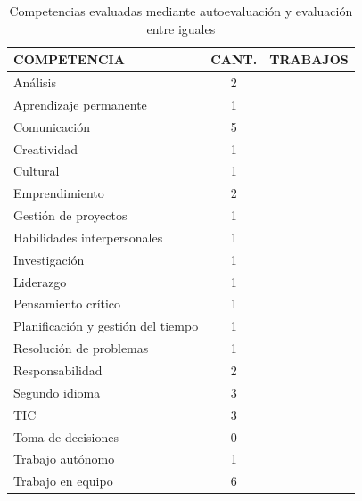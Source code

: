 \begin{table}
  \begin{center}
  \begin{tabular}{| m{3.5cm} | c | m{9cm} |}
    \hline
    COMPETENCIA & CANT. & TRABAJOS\\
    \hline
    \hline
    Análisis & 2 & \cite{carreras2013promotion,lasa2013problem} \\
    \hline
    Aprendizaje permanente & 1 & \cite{oliver2013graduate} \\
    \hline
    Comunicación & 5 &  \cite{masip2013self,ruizacarate2013soft,carreras2013promotion,martinez2014teamwork,oliver2013graduate} \\
    \hline
    Creatividad & 1 & \cite{piedra2010measuring} \\
    \hline
    Cultural & 1 & \cite{oliver2013graduate} \\
    \hline
    Emprendimiento & 2 & \cite{chang2009international,achcaoucaou2014competence} \\
    \hline
    Gestión de proyectos & 1 & \cite{martinez2014teamwork} \\
    \hline
    Habilidades interpersonales & 1 & \cite{martinez2014teamwork} \\
    \hline
    Investigación & 1 & \cite{oliver2013graduate} \\
    \hline
    Liderazgo & 1 & \cite{martinez2014teamwork} \\
    \hline
    Pensamiento crítico & 1 & \cite{arno2011promoting} \\
    \hline
    Planificación y gestión del tiempo & 1 & \cite{martinez2014teamwork} \\
    \hline
    Resolución de problemas & 1 & \cite{oliver2013graduate} \\
    \hline
    Responsabilidad & 2 & \cite{ruizacarate2013soft,carreras2013promotion} \\
    \hline 
    Segundo idioma & 3 & \cite{renau2010teaching,masip2013self,sevilla2012assessment} \\
    \hline
    TIC & 3 & \cite{lasa2013problem,masip2013self,oliver2013graduate} \\
    \hline
    Toma de decisiones & 0 &   \\
    \hline
    Trabajo autónomo & 1 &  \cite{lasa2013problem} \\
    \hline
    Trabajo en equipo & 6 &  \cite{lasa2013problem,ficapal2015learning,ruizacarate2013soft,piedra2010measuring,carreras2013promotion,martinez2014teamwork,oliver2013graduate} \\
    \hline
  \end{tabular}
\end{center}
\caption{Competencias evaluadas mediante autoevaluación y evaluación entre iguales}
\label{tab:CompetenciasAuto}
\end{table}

